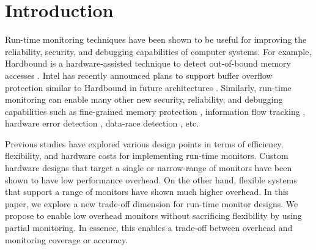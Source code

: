 \section{Introduction}
\label{sec:intro}

Run-time monitoring techniques have been shown to be useful for improving the
reliability, security, and debugging capabilities of computer systems. For
example, Hardbound is a hardware-assisted technique to detect out-of-bound
memory accesses \cite{hardbound-asplos08}.  Intel has
recently announced plans to support buffer overflow protection similar to
Hardbound in future architectures \cite{intel-mpx}. Similarly, run-time
monitoring can enable many other new security, reliability, and debugging
capabilities such as fine-grained memory protection \cite{mondrian-asplos02},
information flow tracking \cite{dift-asplos04, testudo-micro08}, hardware error
detection \cite{argus-micro07}, data-race detection \cite{radish-isca12,
cord-hpca06}, etc. 


Previous studies have explored various design points in terms of efficiency,
flexibility, and hardware costs for implementing run-time monitors. Custom
hardware designs that target a single or narrow-range of monitors have been
shown to have low performance overhead. On the other hand, flexible systems
that support a range of monitors have shown much higher overhead. In this
paper, we explore a new trade-off dimension for run-time monitor designs. We
propose to enable low overhead monitors without sacrificing flexibility by
using partial monitoring. In essence, this enables a trade-off between overhead and
monitoring coverage or accuracy.

